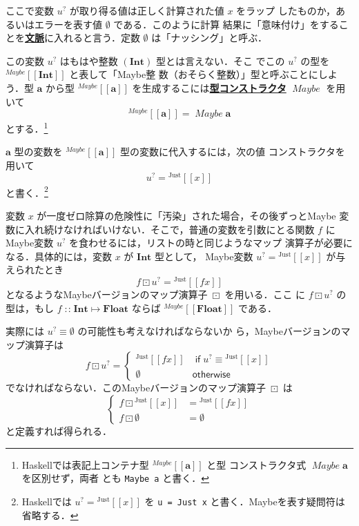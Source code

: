 \documentclass[a5paper,twoside,fleqn]{jsbook}
\def\[{\left[\!\left[}
\def\]{\right]\!\right]}
\newcommand{\programminglanguage}[1]{\textsf{#1}}
\newcommand{\haskell}{\programminglanguage{Haskell}}
\newcommand{\keyword}[1]{{\underline{\textbf{#1}}}}
\newcommand{\code}[1]{\texttt{#1}}
\newcommand{\mKeyword}[1]{\mathsf{#1}} %
\newcommand{\mIfKeyword}{\mKeyword{if}}
\newcommand{\mOtherwiseKeyword}{\mKeyword{otherwise}}
\DeclareMathOperator{\mIf}{\mIfKeyword}
\DeclareMathOperator{\mOtherwise}{\mOtherwiseKeyword}
\newcommand{\mNothing}{\emptyset}
\DeclareMathOperator{\mIn}{{:\!:}}
\DeclareMathOperator{\mMapMaybe}{\boxdot}
\DeclareMathOperator{\mMapsTo}{\mapsto}
\newcommand{\mType}[1]{\mathbf{#1}}
\newcommand{\mFloatType}{\mType{Float}}
\newcommand{\mIntType}{\mType{Int}}
\newcommand{\mGenericTypeAssemble}[2]{{}^{\mTypeConstructor{#1}}\[\mType{#2}\]}
\newcommand{\mMaybeType}[1]{\mGenericTypeAssemble{Maybe}{#1}}
\newcommand{\mTypeConstructor}[1]{\textit{#1}}
\DeclareMathOperator{\mMaybeTypeConstructor}{\mTypeConstructor{Maybe}}
\newcommand{\mGenericValueConstructor}[1]{\mathrm{#1}}
\newcommand{\mGenericWith}[2]{{}^\mGenericValueConstructor{#1}\[#2\]}
\newcommand{\mJustWith}[1]{\mGenericWith{Just}{#1}}
\newcommand{\mMaybe}[1]{{#1}^?}
\newcommand{\mProj}[2]{#1\mMapsTo#2}
\begin{document}
ここで変数 $\mMaybe{u}$ が取り得る値は正しく計算された値 $x$ をラップ
したものか，あるいはエラーを表す値 $\mNothing$ である．このように計算
結果に「意味付け」をすることを\keyword{文脈}に入れると言う．定数
$\mNothing$ は「ナッシング」と呼ぶ．

この変数 $\mMaybe{u}$ はもはや整数 $(\mIntType)$ 型とは言えない．そこ
でこの $\mMaybe{u}$ の型を $\mMaybeType{\mIntType}$ と表して「Maybe整
  数（おそらく整数）」型と呼ぶことにしよう．型 $\mType{a}$ から型
$\mMaybeType{a}$ を生成するこには\keyword{型コンストラクタ}
$\mMaybeTypeConstructor$ を用いて
\begin{equation}
\mMaybeType{a}=\mMaybeTypeConstructor\mType{a}
\end{equation}
とする．\footnote{\haskell では表記上コンテナ型 $\mMaybeType{a}$ と型
  コンストラクタ式 $\mMaybeTypeConstructor\mType{a}$ を区別せず，両者
  とも \code{Maybe a} と書く．}

$\mType{a}$ 型の変数を $\mMaybeType{a}$ 型の変数に代入するには，次の値
コンストラクタを用いて
\begin{equation}
\mMaybe{u}=\mJustWith{x}
\end{equation}
と書く．\footnote{\haskell では $\mMaybe{u}=\mJustWith{x}$ を \code{u
    = Just x} と書く．Maybeを表す疑問符は省略する．}

変数 $x$ が一度ゼロ除算の危険性に「汚染」された場合，その後ずっとMaybe
変数に入れ続けなければいけない．そこで，普通の変数を引数にとる関数 $f$
にMaybe変数 $\mMaybe{u}$ を食わせるには，リストの時と同じようなマップ
演算子が必要になる．具体的には，変数 $x$ が $\mType{Int}$ 型として，
Maybe変数 $\mMaybe{u}=\mJustWith{x}$ が与えられたとき
\begin{equation}
f\mMapMaybe\mMaybe{u}=\mJustWith{fx}
\end{equation}
となるようなMaybeバージョンのマップ演算子 $\mMapMaybe$ を用いる．ここ
に $f\mMapMaybe\mMaybe{u}$ の型は，もし
$f\mIn\mProj{\mIntType}{\mFloatType}$ ならば
$\mMaybeType{\mFloatType}$ である．

実際には $\mMaybe{u}\equiv\mNothing$ の可能性も考えなければならないか
ら，Maybeバージョンのマップ演算子は
\begin{equation}
f\mMapMaybe\mMaybe{u}=\begin{cases}
\mJustWith{fx}&\mIf\mMaybe{u}\equiv\mJustWith{x}\\ \mNothing&\mOtherwise
\end{cases}
\end{equation}
でなければならない．このMaybeバージョンのマップ演算子 $\mMapMaybe$ は
\begin{equation}
\left\{
\begin{aligned}
f\mMapMaybe\mJustWith{x}&=\mJustWith{fx}\\ f\mMapMaybe\mNothing&=\mNothing
\end{aligned}
\right.
\end{equation}
と定義すれば得られる．
\end{document}
